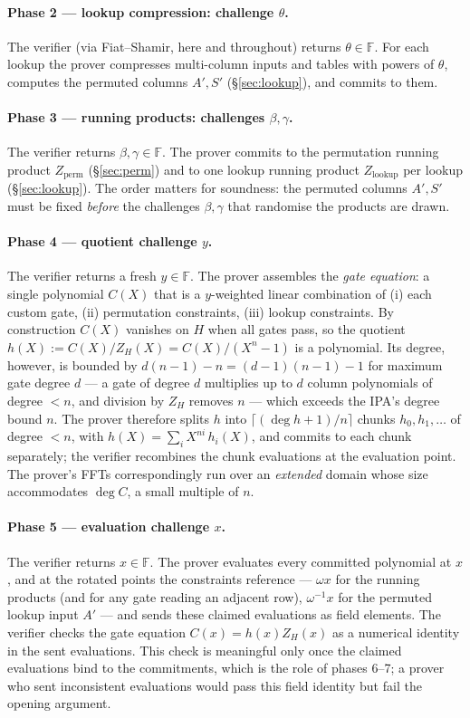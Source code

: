\documentclass[11pt,a4paper]{article}
\theoremstyle{definition}
\newcommand{\F}{\mathbb{F}}
\begin{document}
\paragraph{Phase 2 --- lookup compression: challenge $\theta$.}
The verifier (via Fiat--Shamir, here and throughout) returns
$\theta \in \F$. For each lookup the prover compresses multi-column
inputs and tables with powers of $\theta$, computes the permuted columns
$A', S'$ (\S\ref{sec:lookup}), and commits to them.

\paragraph{Phase 3 --- running products: challenges $\beta, \gamma$.}
The verifier returns $\beta, \gamma \in \F$. The prover commits to the
permutation running product $Z_{\mathrm{perm}}$ (\S\ref{sec:perm}) and to
one lookup running product $Z_{\mathrm{lookup}}$ per lookup
(\S\ref{sec:lookup}). The order matters for soundness: the permuted
columns $A', S'$ must be fixed \emph{before} the challenges
$\beta, \gamma$ that randomise the products are drawn.

\paragraph{Phase 4 --- quotient challenge $y$.}
The verifier returns a fresh $y \in \F$. The prover assembles the
\emph{gate equation}: a single polynomial $C(X)$ that is a $y$-weighted
linear combination of (i) each custom gate, (ii) permutation constraints,
(iii) lookup constraints. By construction $C(X)$ vanishes on $H$ when
all gates pass, so the quotient
$h(X) := C(X) / Z_H(X) = C(X) / (X^n - 1)$ is a polynomial. Its degree,
however, is bounded by \(d(n-1) - n = (d-1)(n-1) - 1\) for maximum gate
degree \(d\) --- a gate of degree \(d\) multiplies up to \(d\) column
polynomials of degree \(< n\), and division by \(Z_H\) removes \(n\) ---
which exceeds the IPA's degree bound $n$. The prover therefore
splits $h$ into \(\lceil (\deg h + 1)/n \rceil\) chunks
$h_0, h_1, \dots$ of degree $< n$, with
$h(X) = \sum_i X^{n i}\, h_i(X)$, and commits to each chunk separately;
the verifier recombines the chunk evaluations at the evaluation point.
The prover's FFTs correspondingly run over an \emph{extended} domain
whose size accommodates $\deg C$, a small multiple of $n$.

\paragraph{Phase 5 --- evaluation challenge $x$.}
The verifier returns $x \in \F$. The prover evaluates every committed
polynomial at $x$, and at the rotated points the constraints reference
--- $\omega x$ for the running products (and for any gate reading an
adjacent row), $\omega^{-1} x$ for the permuted lookup input $A'$ ---
and sends these claimed evaluations as field elements. The verifier checks
the gate equation $C(x) = h(x) Z_H(x)$ as a numerical identity in the
sent evaluations. This check is meaningful only once the claimed
evaluations bind to the commitments, which is the role of phases 6--7;
a prover who sent inconsistent evaluations would pass this field identity
but fail the opening argument.
\end{document}
